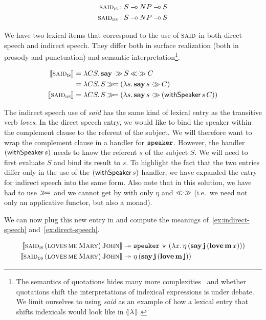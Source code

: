 \begin{align*}
  \textsc{said}_{\textsc{is}} &: S \mathbin{{-}\mkern-3.5mu{\circ}} NP \mathbin{{-}\mkern-3.5mu{\circ}} S \\
  \textsc{said}_{\textsc{ds}} &: S \mathbin{{-}\mkern-3.5mu{\circ}} NP \mathbin{{-}\mkern-3.5mu{\circ}} S
\end{align*}

We have two lexical items that correspond to the use of $\textsc{said}$ in
both direct speech and indirect speech. They differ both in surface
realization (both in prosody and punctuation) and semantic
interpretation\footnote{The semantics of quotations hides many more
  complexities~\cite{shan2010character} and whether quotations shift the
  interpretations of indexical expressions is under debate. We limit
  ourselves to using \emph{said} as an example of how a lexical entry that
  shifts indexicals would look like in ${\llparenthesis \, \lambda \, \rrparenthesis}$.}.

\begin{align*}
  \sem{\abs{said}_{\abs{is}}} &= \lam{C S}{\obj{say} \apr S \aplr C} \\
  &= \lam{C S}{S \hsbind (\lam{s}{\ap{\obj{say}}{s} \apr C})} \\
  \sem{\abs{said}_{\abs{ds}}}
  &= \lam{C S}{S \hsbind (\lam{s}{\ap{\obj{say}}{s} \apr (\app{\withSpeaker}{s}{C})})}
\end{align*}

The indirect speech use of \emph{said} has the same kind of lexical entry
as the transitive verb \emph{loves}. In the direct speech entry, we would
like to bind the speaker within the complement clause to the referent of
the subject. We will therefore want to wrap the complement clause in a
handler for $\mathtt{speaker}$. However, the handler $(\textsf{withSpeaker}\,s)$
needs to know the referent $s$ of the subject $S$. We will need to first
evaluate $S$ and bind its result to $s$. To highlight the fact that the two
entries differ only in the use of the $(\textsf{withSpeaker}\,s)$ handler, we
have expanded the entry for indirect speech into the same form. Also note
that in this solution, we have had to use $\mathbin{\gg\!=}$ and we cannot get by
with only $\eta$ and $\mathbin{\ll\!\!\cdot\!\!\gg}$ (i.e.\ we need not only an applicative
functor, but also a monad).

We can now plug this new entry in and compute the meanings
of~\eqref{ex:indirect-speech} and~\eqref{ex:direct-speech}.

\NoChapterPrefix
\begin{align}
  \llbracket \textsc{said}_{\textsc{is}}\,(\textsc{loves}\,\textsc{me}\,\textsc{Mary})\,\textsc{John} \rrbracket
  & \twoheadrightarrow \mathtt{speaker}\,\star\,(\lambda x.\, \eta\,(\textbf{say}\,\textbf{j}\,(\textbf{love}\,\textbf{m}\,x))) \\
  \llbracket \textsc{said}_{\textsc{ds}}\,(\textsc{loves}\,\textsc{me}\,\textsc{Mary})\,\textsc{John} \rrbracket
  & \twoheadrightarrow \eta\,(\textbf{say}\,\textbf{j}\,(\textbf{love}\,\textbf{m}\,\textbf{j}))
\end{align}
\ChapterPrefix

